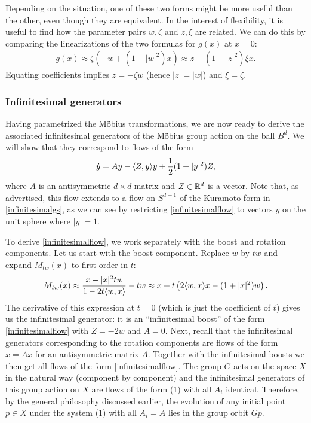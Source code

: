 \documentclass[%
 aip,
 amsmath,amssymb,
 reprint,%
]{revtex4-1}
\begin{document}
Depending on the situation, one of these two forms might be more useful than the other, even though they are equivalent. In the interest of flexibility, it is useful to find how the parameter pairs $w,\zeta$ and  $z,\xi$ are related. We can do this by comparing the linearizations of the two formulas for $g(x)$ at $x=0$: 
\begin{align*}
    g(x) \approx \zeta  \left(-w + (1-|w|^2)x \right) \approx z + (1 - |z|^2)\xi x.
\end{align*}
Equating coefficients implies $z = - \zeta w$ (hence $|z| = |w|$) and $\xi = \zeta$.


\subsubsection{Infinitesimal generators}
Having parametrized the Möbius transformations, we are now ready to derive the associated infinitesimal generators of the Möbius group action on the ball $B^d$. We will show that they correspond to flows of the form 
\begin{equation}
\dot y = Ay -  \langle Z, y \rangle y + { 1\over 2}  (1+|y|^2) Z , \label{infinitesimalflow}
\end{equation}
where $A$ is an antisymmetric $d \times d$ matrix and $Z \in {\Bbb R}^d$ is a vector. Note that, as advertised, this flow extends to a flow on $S^{d-1}$ of the Kuramoto form in \eqref{infinitesimalgs}, as we can see by restricting \eqref{infinitesimalflow} to vectors $y$ on the unit sphere where $|y|=1$.



To derive \eqref{infinitesimalflow}, we work separately with the boost and rotation components. Let us start with the boost component. Replace $w$ by $tw$ and expand $M_{tw}(x)$ to first order in $t$: $$
M_{tw} (x) \approx {x - |x|^2 tw \over 1-2 t \langle w,x \rangle} -tw \approx x + t \left( 2 \langle w, x\rangle x  - (1+|x|^2)w \right).
$$
The derivative of this expression at $t=0$ (which is just the coefficient of $t$) gives us the infinitesimal generator: it  is an ``infinitesimal boost'' of the form \eqref{infinitesimalflow} with $Z = -2w$ and $A = 0$.  Next, recall that the infinitesimal generators corresponding to the rotation components are flows of the form $\dot x = Ax$ for an antisymmetric matrix $A$. Together with the infinitesimal boosts we then get all flows of the form \eqref{infinitesimalflow}.  The group $G$ acts on the space $X$ in the natural way (component by component) and the infinitesimal generators of this group action on $X$ are flows of the form (1) with all $A_i$ identical.  Therefore, by the general philosophy discussed earlier, the evolution of any initial point $p \in X$ under the system (1) with all $A_i = A$ lies in the group orbit $Gp$. 
\end{document}
